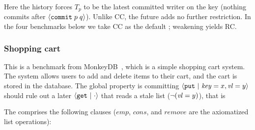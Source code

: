 \vspace{-.4cm}\par\nobreak\noindent
Here the history forces $T_p$ to be the latest committed writer on the key (nothing commits after ${\langle} {\boldsymbol{{\tt commit}}\;{p\;q}} {\rangle}$). Unlike CC, the future adds no further restriction. In the four benchmarks below we take CC as the default \tyName{}; weakening yields RC.

\newpage
\subsubsection*{Shopping cart} This is a benchmark from MonkeyDB~\cite{MonkeyDB}, which is a simple shopping cart system. The system allows users to add and delete items to their cart, and the cart is stored in the database. The global property is committing \({\langle} {\boldsymbol{{\tt put}}~|~{\mathit{key}=x,\mathit{vl}=y}} {\rangle}\) should rule out a later \({\langle} {\boldsymbol{{\tt get}}~|~{\cdot}} {\rangle}\) that reads a stale list (\(\neg(\mathit{vl}=y)\)), that is
\vspace{-.35cm}\par{}
\vspace{-.4cm}\par\nobreak\noindent
The \tyName{} comprises the following clauses (\(\mathit{emp}\), \(\mathit{cons}\), and \(\mathit{remove}\) are the axiomatized list operations):
